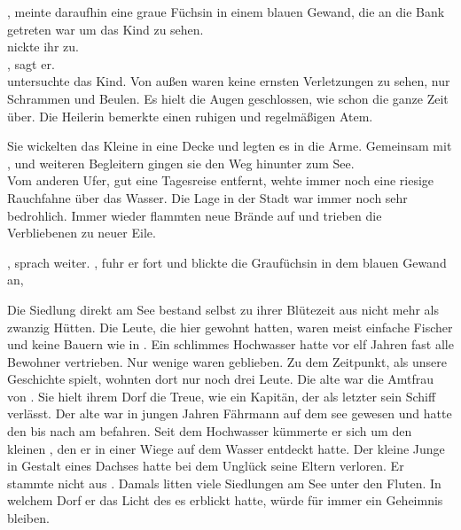\begin{Large}
, meinte daraufhin eine graue Füchsin in einem blauen Gewand, die an die Bank getreten war um das Kind zu sehen. \\
{\Eno} nickte ihr zu.\\
, sagt er.\\
{\Salbana} untersuchte das Kind. Von außen waren keine ernsten Verletzungen zu sehen, nur Schrammen und Beulen. Es hielt die Augen geschlossen, wie schon die ganze Zeit über. Die Heilerin bemerkte einen ruhigen und regelmäßigen Atem.

Sie wickelten das Kleine in eine Decke und legten es {\Nox} in die Arme. Gemeinsam mit {\Salbana}, {\Eno} und weiteren Begleitern gingen sie den Weg hinunter zum See.\\
Vom anderen Ufer, gut eine Tagesreise entfernt, wehte immer noch eine riesige Rauchfahne über das Wasser. Die Lage in der Stadt {\Tern} war immer noch sehr bedrohlich.
Immer wieder flammten neue Brände auf und trieben die Verbliebenen zu neuer Eile.

, sprach {\Nox} weiter. , fuhr er fort und blickte die Graufüchsin in dem blauen Gewand an, 

Die Siedlung {\AltBerna} direkt am See bestand selbst zu ihrer Blütezeit aus nicht mehr als zwanzig Hütten. Die Leute, die hier gewohnt hatten, waren meist einfache Fischer und keine Bauern wie in {\Berna}. Ein schlimmes Hochwasser hatte vor elf Jahren fast alle Bewohner vertrieben. Nur wenige waren geblieben. Zu dem Zeitpunkt, als unsere Geschichte spielt, wohnten dort nur noch drei Leute. Die alte {\Tea} war die Amtfrau von {\AltBerna}. Sie hielt ihrem Dorf die Treue, wie ein Kapitän, der als letzter sein Schiff verlässt. Der alte {\Marn} war in jungen Jahren Fährmann auf dem {\Tern}see gewesen und hatte den {\Rhin} bis nach {\Toris} am {\Dreifluss} befahren. Seit dem Hochwasser kümmerte er sich um den kleinen {\Piedo}, den er in einer Wiege auf dem Wasser entdeckt hatte. Der kleine Junge in Gestalt eines Dachses hatte bei dem Unglück seine Eltern verloren. Er stammte nicht aus {\AltBerna}. Damals litten viele Siedlungen am See unter den Fluten. In welchem Dorf er das Licht des {\Enland}es erblickt hatte, würde für immer ein Geheimnis bleiben.


\end{Large}
